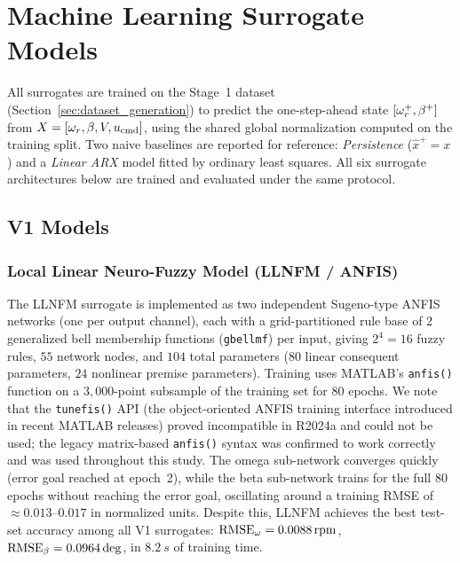 
\section{Machine Learning Surrogate Models}
\label{sec:ml_surrogates}

All surrogates are trained on the Stage~1 dataset
(Section~\ref{sec:dataset_generation}) to predict the one-step-ahead state
$[\omega_r^{+},\beta^{+}]$ from $X=[\omega_r,\beta,V,u_{\text{cmd}}]$, using the
shared global normalization computed on the training split. Two naive
baselines are reported for reference: \emph{Persistence}
($\hat{x}^{+}=x$) and a \emph{Linear ARX} model fitted by ordinary least
squares. All six surrogate architectures below are trained and evaluated
under the same protocol.

\subsection{V1 Models}
\label{subsec:v1_models}

\subsubsection{Local Linear Neuro-Fuzzy Model (LLNFM / ANFIS)}
\label{subsubsec:llnfm}

The LLNFM surrogate is implemented as two independent Sugeno-type
ANFIS \citep{jang_anfis_1993} networks (one per output channel), each
with a grid-partitioned rule base
of $2$ generalized bell membership functions (\texttt{gbellmf}) per input,
giving $2^4=16$ fuzzy rules, $55$ network nodes, and $104$ total parameters
($80$ linear consequent parameters, $24$ nonlinear premise parameters).
Training uses MATLAB's \texttt{anfis()} function on a $3{,}000$-point
subsample of the training set for $80$ epochs. We note that the
\texttt{tunefis()} API (the object-oriented ANFIS training interface
introduced in recent MATLAB releases) proved incompatible in R2024a and
could not be used; the legacy matrix-based \texttt{anfis()} syntax was
confirmed to work correctly and was used throughout this study. The omega
sub-network converges quickly (error goal reached at epoch~2), while the
beta sub-network trains for the full $80$ epochs without reaching the error
goal, oscillating around a training RMSE of $\approx 0.013$--$0.017$ in
normalized units. Despite this, LLNFM achieves the best test-set accuracy
among all V1 surrogates: $\text{RMSE}_{\omega} = \SI{0.0088}{rpm}$,
$\text{RMSE}_{\beta} = 0.0964\deg$, in $\SI{8.2}{s}$ of training time.

